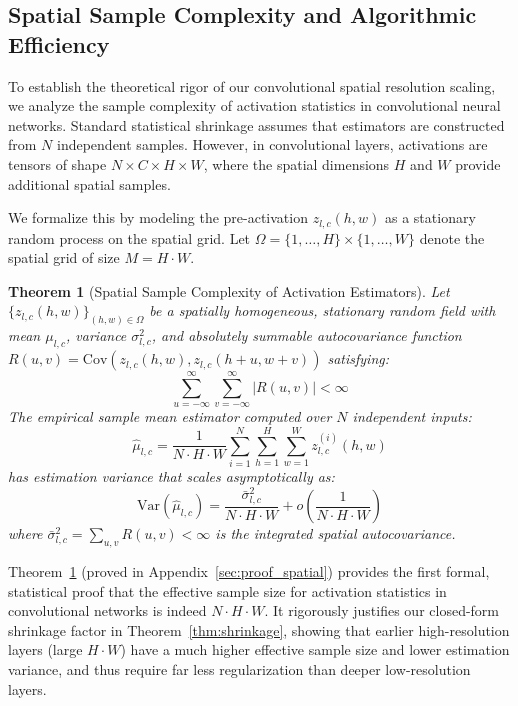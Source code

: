 \documentclass{article}
\theoremstyle{plain}
\newtheorem{theorem}{Theorem}[section]
\theoremstyle{definition}
\theoremstyle{remark}
\begin{document}
\subsection{Spatial Sample Complexity and Algorithmic Efficiency}
\label{sec:spatial_complexity}

To establish the theoretical rigor of our convolutional spatial resolution scaling, we analyze the sample complexity of activation statistics in convolutional neural networks. Standard statistical shrinkage assumes that estimators are constructed from $N$ independent samples. However, in convolutional layers, activations are tensors of shape $N \times C \times H \times W$, where the spatial dimensions $H$ and $W$ provide additional spatial samples.

We formalize this by modeling the pre-activation $z_{l,c}(h, w)$ as a stationary random process on the spatial grid. Let $\Omega = \{1, \dots, H\} \times \{1, \dots, W\}$ denote the spatial grid of size $M = H \cdot W$.

\begin{theorem}[Spatial Sample Complexity of Activation Estimators]
\label{thm:spatial_sample_complexity}
Let $\{z_{l,c}(h, w)\}_{(h,w) \in \Omega}$ be a spatially homogeneous, stationary random field with mean $\mu_{l,c}$, variance $\sigma^2_{l,c}$, and absolutely summable autocovariance function $R(u, v) = \mathrm{Cov}(z_{l,c}(h,w), z_{l,c}(h+u, w+v))$ satisfying:
\begin{equation}
    \sum_{u=-\infty}^{\infty} \sum_{v=-\infty}^{\infty} |R(u, v)| < \infty
\end{equation}
The empirical sample mean estimator computed over $N$ independent inputs:
\begin{equation}
    \hat{\mu}_{l,c} = \frac{1}{N \cdot H \cdot W} \sum_{i=1}^N \sum_{h=1}^H \sum_{w=1}^W z^{(i)}_{l,c}(h, w)
\end{equation}
has estimation variance that scales asymptotically as:
\begin{equation}
    \mathrm{Var}(\hat{\mu}_{l,c}) = \frac{\bar{\sigma}^2_{l,c}}{N \cdot H \cdot W} + o\left(\frac{1}{N \cdot H \cdot W}\right)
\end{equation}
where $\bar{\sigma}^2_{l,c} = \sum_{u, v} R(u, v) < \infty$ is the integrated spatial autocovariance.
\end{theorem}

Theorem~\ref{thm:spatial_sample_complexity} (proved in Appendix~\ref{sec:proof_spatial}) provides the first formal, statistical proof that the effective sample size for activation statistics in convolutional networks is indeed $N \cdot H \cdot W$. It rigorously justifies our closed-form shrinkage factor in Theorem~\ref{thm:shrinkage}, showing that earlier high-resolution layers (large $H \cdot W$) have a much higher effective sample size and lower estimation variance, and thus require far less regularization than deeper low-resolution layers.
\end{document}
